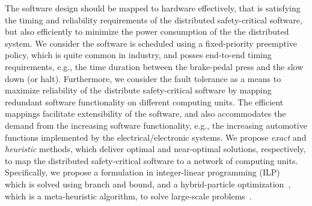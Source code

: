 The software design should be mapped to hardware effectively, that is satisfying the timing and reliability requirements of the distributed safety-critical software, but also efficiently to minimize the power consumption of the the distributed system.  We consider the software is scheduled using a fixed-priority preemptive policy, which is quite common in industry, and posses end-to-end timing requirements, e.g., the time duration between the brake-pedal press and the slow down (or halt). Furthermore,  we consider the fault tolerance as a means to maximize reliability of the distribute safety-critical software by mapping redundant software functionality on different computing units. The efficient mappings facilitate extensibility of the software, and also accommodates the demand from the increasing software functionality, e.g., the increasing automotive functions implemented by the electrical/electronic systems. We propose  \textit{exact} and \textit{heuristic} methods, which deliver optimal and near-optimal solutions, respectively, to map the distributed safety-critical software to a network of computing units. Specifically, we propose a formulation in integer-linear programming (ILP)~\cite{Mahmud5222} which is solved using branch and bound, and a hybrid-particle optimization~\cite{Mirjalili2019ParticleOptimisation}, which is a meta-heuristic algorithm, to solve large-scale problems~\cite{Mahmud2019Power-awareOptimization}.

